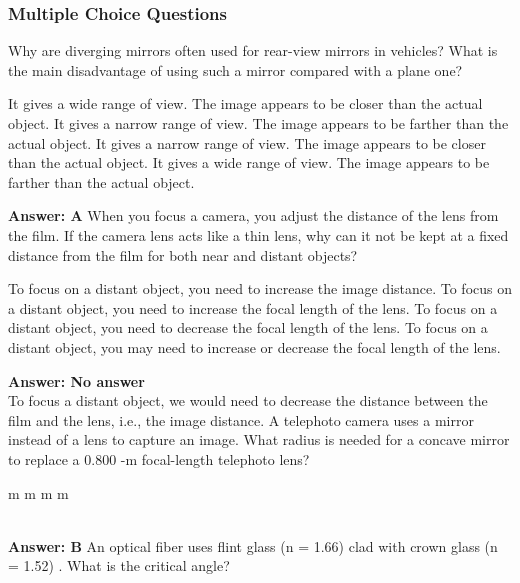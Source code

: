 \documentclass[12pt,addpoints]{exam}
\begin{document}
{{{				\subsubsection*{Multiple Choice Questions}
				\begin{questions}
					\question Why are diverging mirrors often used for rear-view mirrors in vehicles? What is the main disadvantage of using such a mirror compared with a plane one?
					\begin{choices}
						\choice It gives a wide range of view. The image appears to be closer than the actual object.
						\choice It gives a narrow range of view. The image appears to be farther than the actual object.
						\choice It gives a narrow range of view. The image appears to be closer than the actual object.
						\choice It gives a wide range of view. The image appears to be farther than the actual object.	
					\end{choices}
					\textbf{Answer: A}
					\question When you focus a camera, you adjust the distance of the lens from the film. If the camera lens acts like a thin lens, why can it not be kept at a fixed distance from the film for both near and distant objects?
					\begin{choices}
						\choice To focus on a distant object, you need to increase the image distance.
						\choice To focus on a distant object, you need to increase the focal length of the lens.
						\choice To focus on a distant object, you need to decrease the focal length of the lens.
						\choice To focus on a distant object, you may need to increase or decrease the focal length of the lens.
					\end{choices}
				 	\textbf{Answer: No answer} \\
				 	To focus a distant object, we would need to decrease the distance between the film and the lens, i.e., the image distance. 
					\question A telephoto camera uses a mirror instead of a lens to capture an image. What radius is needed for a concave mirror to replace a 0.800 -m focal-length telephoto lens? \\
					\begin{oneparchoices}
						 m
						 m
						 m
						 m
					\end{oneparchoices}
					\\ \textbf{Answer: B}
					\question An optical fiber uses flint glass (n = 1.66) clad with crown glass (n = 1.52) . What is the critical angle? \\
					\begin{oneparchoices}

\end{oneparchoices}
\end{questions}}}}
\end{document}
